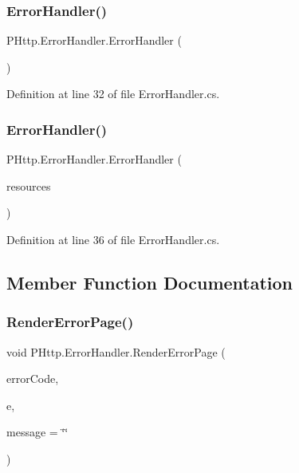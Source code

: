 \subsubsection{\texorpdfstring{Error\+Handler()}{ErrorHandler()}\hspace{0.1cm}{\footnotesize\ttfamily [1/2]}}
{\footnotesize\ttfamily P\+Http.\+Error\+Handler.\+Error\+Handler (\begin{DoxyParamCaption}{ }\end{DoxyParamCaption})}



Definition at line 32 of file Error\+Handler.\+cs.

\mbox{\label{class_p_http_1_1_error_handler_ac59475bdf366717e5db2c235689d9d64}} 
\subsubsection{\texorpdfstring{Error\+Handler()}{ErrorHandler()}\hspace{0.1cm}{\footnotesize\ttfamily [2/2]}}
{\footnotesize\ttfamily P\+Http.\+Error\+Handler.\+Error\+Handler (\begin{DoxyParamCaption}\item[{string}]{resources }\end{DoxyParamCaption})}



Definition at line 36 of file Error\+Handler.\+cs.



\subsection{Member Function Documentation}
\mbox{\label{class_p_http_1_1_error_handler_a3410f7bc3ca877d7e09c094839c09c2c}} 
\subsubsection{\texorpdfstring{Render\+Error\+Page()}{RenderErrorPage()}\hspace{0.1cm}{\footnotesize\ttfamily [1/2]}}
{\footnotesize\ttfamily void P\+Http.\+Error\+Handler.\+Render\+Error\+Page (\begin{DoxyParamCaption}\item[{int}]{error\+Code,  }\item[{\hyperlink{class_p_http_1_1_http_request_event_args}{Http\+Request\+Event\+Args}}]{e,  }\item[{string}]{message = {\ttfamily \char`\"{}\char`\"{}} }\end{DoxyParamCaption})}



